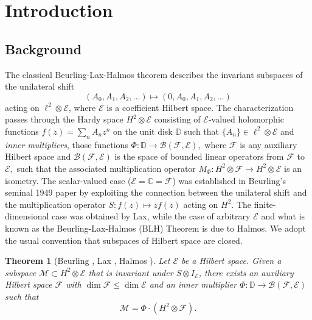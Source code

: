 \documentclass[a4paper,reqno,index]{amsart}
\newcommand{\df}[1]{{\textit{#1}}{\index{#1}}}
\numberwithin{equation}{section}
\newtheorem{theorem}{Theorem}[section]
\newcommand{\cB}{\mathcal{B}}
\newcommand{\HSF}{\mathcal{F}}
\newcommand{\HSE}{\mathcal{E}}
\theoremstyle{definition}
\begin{document}
\section{Introduction}

\onehalfspacing

\subsection{Background}
The classical Beurling-Lax-Halmos theorem  describes the invariant subspaces of the unilateral shift
\[(A_0, A_1, A_2, \dots)     \mapsto (0, A_0, A_1, A_2, \dots) \]
acting on $\ell^2\otimes\mathcal{E}$, where $\mathcal{E}$ is a coefficient 
Hilbert space. The characterization  passes through the Hardy space $H^2\otimes\mathcal{E}$ consisting of $\mathcal{E}$-valued holomorphic functions $f(z)=\sum_nA_nz^n$ on the unit disk $\mathbb{D}$ such that $\{A_n\}\in \ell^2\otimes\mathcal{E}$
and \df{inner multipliers}, those  functions $\Phi:\mathbb{D}\to\mathcal{B}(\mathcal{F}, \mathcal{E}),$ where $\mathcal{F}$ is any auxiliary Hilbert space and \df{$\cB(\HSF,\HSE)$} 
is the space of bounded linear operators from $\HSF$ to $\HSE,$ such that the associated multiplication operator $M_{\Phi}:H^2\otimes\mathcal{F}\to H^2\otimes\mathcal{E}$ is an isometry. 
The scalar-valued case ($\mathcal{E}=\mathbb{C}=\HSF$) was established in Beurling's seminal 1949 paper
by exploiting  the connection between the unilateral shift and the multiplication operator $S:f(z)\mapsto zf(z)$ acting on $H^2.$ The finite-dimensional case was obtained by Lax, while  
the case of arbitrary $\HSE$ and what is known as the Beurling-Lax-Halmos (BLH) Theorem is due to Halmos. We adopt the usual convention that  subspaces
of Hilbert space are closed.


\begin{theorem}[Beurling \cite{Beuroriginal}, Lax \cite{LaxOriginal}, Halmos \cite{Halmosoriginal}] \label{originalBLH}
Let $\mathcal{E}$ be a Hilbert space. Given a  subspace $\mathcal{M}\subset H^2\otimes\mathcal{E}$ that is invariant under $S\otimes I_{\mathcal{E}}$, there exists an auxiliary Hilbert space $\mathcal{F}$ with $\dim \mathcal{F}\le \dim\mathcal{E}$ and an inner multiplier $\Phi:\mathbb{D}\to\mathcal{B}(\mathcal{F}, \mathcal{E})$ such that \[\mathcal{M}=\Phi\cdot (H^2\otimes\mathcal{F}).\]
\end{theorem}
\end{document}
